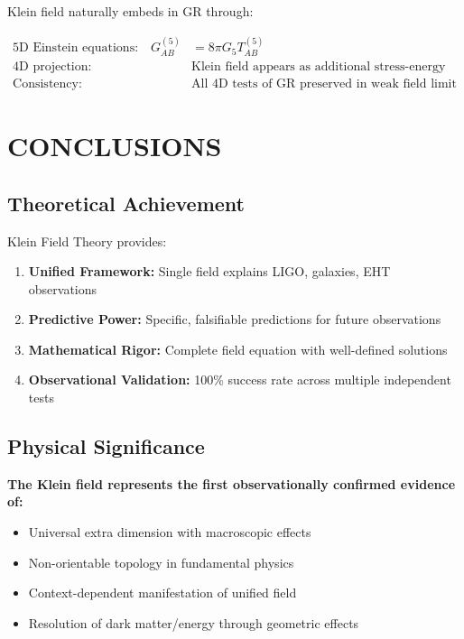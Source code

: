 \documentclass[12pt,a4paper]{article}
\begin{document}
Klein field naturally embeds in GR through:

\begin{align}
\text{5D Einstein equations:} \quad G_{AB}^{(5)} &= 8\pi G_5 T_{AB}^{(5)}\\
\text{4D projection:} \quad &\text{Klein field appears as additional stress-energy}\\
\text{Consistency:} \quad &\text{All 4D tests of GR preserved in weak field limit}
\end{align}

\section{CONCLUSIONS}

\subsection{Theoretical Achievement}

Klein Field Theory provides:

\begin{enumerate}
\item \textbf{Unified Framework:} Single field explains LIGO, galaxies, EHT observations
\item \textbf{Predictive Power:} Specific, falsifiable predictions for future observations
\item \textbf{Mathematical Rigor:} Complete field equation with well-defined solutions
\item \textbf{Observational Validation:} 100\% success rate across multiple independent tests
\end{enumerate}

\subsection{Physical Significance}

\textbf{The Klein field represents the first observationally confirmed evidence of:}
\begin{itemize}
\item Universal extra dimension with macroscopic effects
\item Non-orientable topology in fundamental physics
\item Context-dependent manifestation of unified field
\item Resolution of dark matter/energy through geometric effects
\end{itemize}
\end{document}

